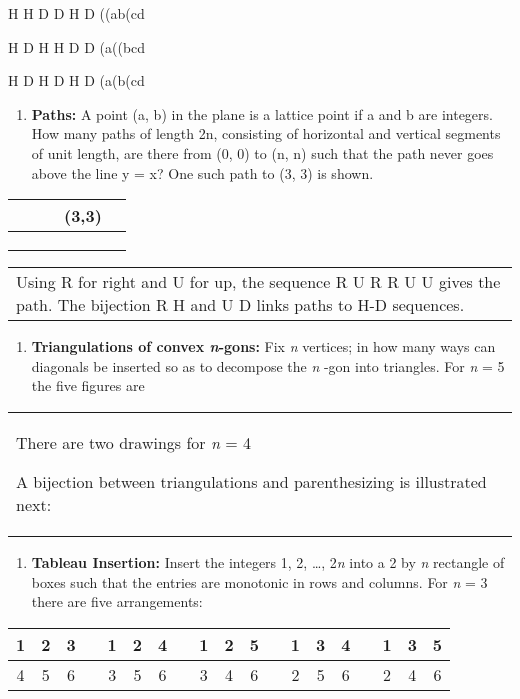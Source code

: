\documentclass[10pt,letter]{article}
\renewenvironment{quote}
  {\begin{tabular}{|p{13cm}}}
  {\end{tabular}}
\begin{document}
H H D D H D   ((ab(cd

H D H H D D   (a((bcd

H D H D H D  (a(b(cd
\begin{enumerate}
\def\labelenumi{\Roman{enumi}.}

\item
  \textbf{Paths:} A point (a, b) in the plane is a lattice point if a
  and b are integers. How many paths of length 2n, consisting of
  horizontal and vertical segments of unit length, are there from (0, 0)
  to (n, n) such that the path never goes above the line y = x? One such
  path to (3, 3) is shown.

\end{enumerate}
\begin{longtable}[]{@{}lllll@{}}
\toprule
& & & (3,3) &\tabularnewline
\midrule
\endhead
& & & &\tabularnewline
& & & &\tabularnewline
& & & &\tabularnewline
\bottomrule

\end{longtable}
\begin{quote}
Using R for right and U for up, the sequence R U R R U U gives the path.
The bijection R H and U D links paths to H-D sequences.

\end{quote}
\begin{enumerate}
\def\labelenumi{\Roman{enumi}.}

\item
  \textbf{Triangulations of convex \emph{n}-gons:} Fix \emph{n}
  vertices; in how many ways can diagonals be inserted so as to
  decompose the \emph{n} -gon into triangles. For \emph{n} = 5 the five
  figures are

\end{enumerate}
\begin{quote}
There are two drawings for \emph{n} = 4

A bijection between triangulations and parenthesizing is illustrated
next:

\end{quote}
\begin{enumerate}
\def\labelenumi{\Roman{enumi}.}

\item
  \textbf{Tableau Insertion:} Insert the integers 1, 2, \ldots{},
  2\emph{n} into a 2 by \emph{n} rectangle of boxes such that the
  entries are monotonic in rows and columns. For \emph{n} = 3 there are
  five arrangements:

\end{enumerate}
\begin{longtable}[]{@{}ccccccccccccccccccc@{}}
\toprule
1 & 2 & 3 & & 1 & 2 & 4 & & 1 & 2 & 5 & & 1 & 3 & 4 & & 1 & 3 &
5\tabularnewline
\midrule
\endhead
4 & 5 & 6 & & 3 & 5 & 6 & & 3 & 4 & 6 & & 2 & 5 & 6 & & 2 & 4 &
6\tabularnewline
\bottomrule

\end{longtable}
\end{document}
